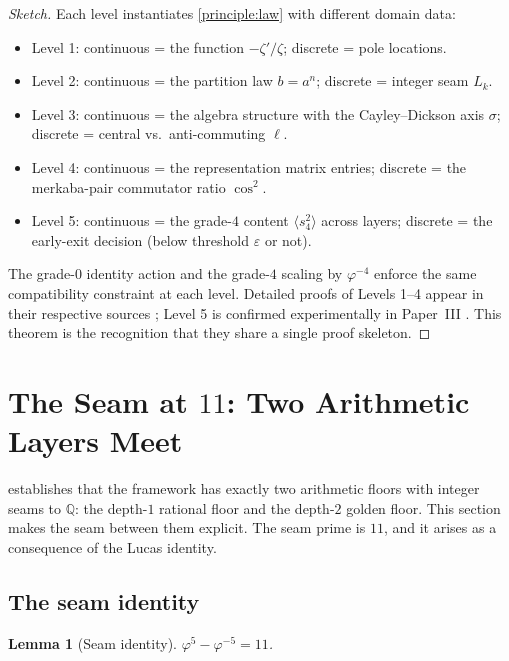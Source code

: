 \documentclass[11pt,a4paper]{article}
\theoremstyle{plain}
\newtheorem{lemma}[theorem]{Lemma}
\theoremstyle{definition}
\theoremstyle{remark}
\numberwithin{equation}{section}
\providecommand{\Q}{\mathbb{Q}}
\providecommand{\vp}{\varphi}
\providecommand{\Lk}{L}
\begin{document}
\begin{proof}[Sketch]
Each level instantiates \cref{principle:law} with different
domain data:
\begin{itemize}\itemsep0pt
  \item Level 1: continuous = the function $-\zeta'/\zeta$;
    discrete = pole locations.
  \item Level 2: continuous = the partition law $b = a^n$;
    discrete = integer seam $\Lk_k$.
  \item Level 3: continuous = the algebra structure with the
    Cayley--Dickson axis $\sigma$; discrete = central vs.\
    anti-commuting $\ell$.
  \item Level 4: continuous = the representation matrix entries;
    discrete = the merkaba-pair commutator ratio $\cos^2$.
  \item Level 5: continuous = the grade-$4$ content
    $\langle s_4^2 \rangle$ across layers; discrete = the
    early-exit decision (below threshold $\varepsilon$ or not).
\end{itemize}
The grade-$0$ identity action and the grade-$4$ scaling by
$\vp^{-4}$ enforce the same compatibility constraint at each
level.  Detailed proofs of Levels 1--4 appear in
their respective sources \cite{echo-rh,two-floor,cd-lift,fold-breach};
Level 5 is confirmed experimentally in Paper~III
\cite[\S 12]{paper-III-monad}.
This theorem is the recognition that they share a single proof
skeleton.
\end{proof}

\section{The Seam at \texorpdfstring{$11$}{11}: Two Arithmetic Layers Meet}
\label{sec:seam}

 establishes that the framework has exactly two
arithmetic floors with integer seams to $\Q$: the depth-$1$
rational floor and the depth-$2$ golden floor.  This section makes
the seam between them explicit.  The seam prime is $11$, and it
arises as a consequence of the Lucas identity.

\subsection{The seam identity}

\begin{lemma}[Seam identity]
\label{lem:seam-11}
$\vp^5 - \vp^{-5} = 11$.
\end{lemma}
\end{document}
